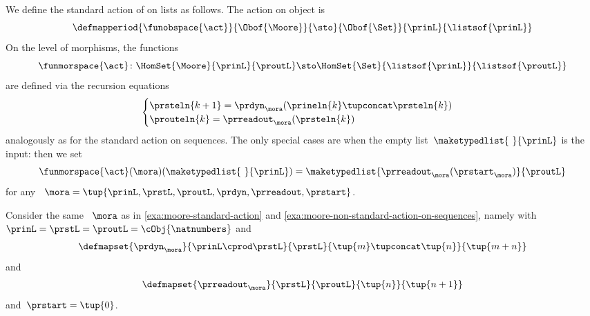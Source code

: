 {\begin{definition}
    \label{def:moore-standard-action-on-lists}
    We define the standard action of  on lists as follows.
    The action on object is
    \begin{equation}
        \defmapperiod{\funobspace{\act}}
        {\Obof{\Moore}}
        {\sto}
        {\Obof{\Set}}
        {\prinL}
        {\listsof{\prinL}}
    \end{equation}
    On the level of morphisms, the functions
    \begin{equation}
        \funmorspace{\act} \colon \HomSet{\Moore}{\prinL}{\proutL} \sto \HomSet{\Set}{ \listsof{\prinL}}{\listsof{\proutL}}
    \end{equation}
    are defined via the recursion equations
    \begin{equation}
        \begin{cases}
            \prsteln{k+1} = \prdyn_\mora(\prineln{k} \tupconcat \prsteln{k}) \\
            \prouteln{k} = \prreadout_\mora(\prsteln{k})
        \end{cases}
    \end{equation}
    analogously as for the standard action on sequences.
    The only special cases are when the empty list~$\maketypedlist{\ }{\prinL}$ is the input: then we set
    \begin{equation}
        \funmorspace{\act}(\mora)(\maketypedlist{\ }{\prinL}) = \maketypedlist{ \prreadout_\mora(\prstart_\mora) }{\proutL}
    \end{equation}
    for any ~$\mora = \tup{\prinL,\prstL,\proutL,\prdyn,\prreadout,\prstart}$.
\end{definition}

\begin{example}
    \label{exa:moore-non-standard-action-on-lists}
    Consider the same ~$\mora$ as in \cref{exa:moore-standard-action} and \cref{exa:moore-non-standard-action-on-sequences}, namely with~$\prinL = \prstL = \proutL = \cObj{\natnumbers}$
    and
    \begin{equation}
        \defmapset{
            \prdyn_\mora
        }{
            \prinL \cprod \prstL
        }{
            \prstL
        }{
            \tup{m} \tupconcat \tup{n}
        }{
            \tup{m + n}
        }
    \end{equation}
    and
    \begin{equation}
        \defmapset{
            \prreadout_\mora
        }{
            \prstL
        }{
            \proutL
        }{
            \tup{n}
        }{
            \tup{n+1}
        }
    \end{equation}
    and~$\prstart = \tup{0}$.


\end{example}}
